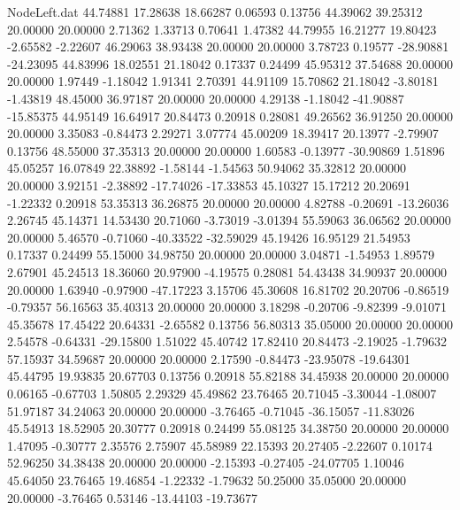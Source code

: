 \begin{filecontents}{NodeLeft.dat}
  44.74881   17.28638   18.66287     0.06593    0.13756   44.39062   39.25312   20.00000   20.00000    2.71362    1.33713    0.70641    1.47382
  44.79955   16.21277   19.80423    -2.65582   -2.22607   46.29063   38.93438   20.00000   20.00000    3.78723    0.19577  -28.90881  -24.23095
  44.83996   18.02551   21.18042     0.17337    0.24499   45.95312   37.54688   20.00000   20.00000    1.97449   -1.18042    1.91341    2.70391
  44.91109   15.70862   21.18042    -3.80181   -1.43819   48.45000   36.97187   20.00000   20.00000    4.29138   -1.18042  -41.90887  -15.85375
  44.95149   16.64917   20.84473     0.20918    0.28081   49.26562   36.91250   20.00000   20.00000    3.35083   -0.84473    2.29271    3.07774
  45.00209   18.39417   20.13977    -2.79907    0.13756   48.55000   37.35313   20.00000   20.00000    1.60583   -0.13977  -30.90869    1.51896
  45.05257   16.07849   22.38892    -1.58144   -1.54563   50.94062   35.32812   20.00000   20.00000    3.92151   -2.38892  -17.74026  -17.33853
  45.10327   15.17212   20.20691    -1.22332    0.20918   53.35313   36.26875   20.00000   20.00000    4.82788   -0.20691  -13.26036    2.26745
  45.14371   14.53430   20.71060    -3.73019   -3.01394   55.59063   36.06562   20.00000   20.00000    5.46570   -0.71060  -40.33522  -32.59029
  45.19426   16.95129   21.54953     0.17337    0.24499   55.15000   34.98750   20.00000   20.00000    3.04871   -1.54953    1.89579    2.67901
  45.24513   18.36060   20.97900    -4.19575    0.28081   54.43438   34.90937   20.00000   20.00000    1.63940   -0.97900  -47.17223    3.15706
  45.30608   16.81702   20.20706    -0.86519   -0.79357   56.16563   35.40313   20.00000   20.00000    3.18298   -0.20706   -9.82399   -9.01071
  45.35678   17.45422   20.64331    -2.65582    0.13756   56.80313   35.05000   20.00000   20.00000    2.54578   -0.64331  -29.15800    1.51022
  45.40742   17.82410   20.84473    -2.19025   -1.79632   57.15937   34.59687   20.00000   20.00000    2.17590   -0.84473  -23.95078  -19.64301
  45.44795   19.93835   20.67703     0.13756    0.20918   55.82188   34.45938   20.00000   20.00000    0.06165   -0.67703    1.50805    2.29329
  45.49862   23.76465   20.71045    -3.30044   -1.08007   51.97187   34.24063   20.00000   20.00000   -3.76465   -0.71045  -36.15057  -11.83026
  45.54913   18.52905   20.30777     0.20918    0.24499   55.08125   34.38750   20.00000   20.00000    1.47095   -0.30777    2.35576    2.75907
  45.58989   22.15393   20.27405    -2.22607    0.10174   52.96250   34.38438   20.00000   20.00000   -2.15393   -0.27405  -24.07705    1.10046
  45.64050   23.76465   19.46854    -1.22332   -1.79632   50.25000   35.05000   20.00000   20.00000   -3.76465    0.53146  -13.44103  -19.73677

\end{filecontents}
